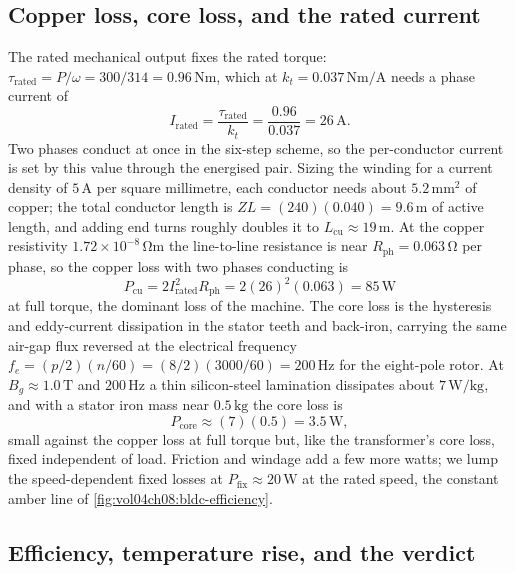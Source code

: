 \subsection{Copper loss, core loss, and the rated current}

The rated mechanical output fixes the rated torque: $\tau_{\text{rated}}
= P/\omega = 300/314 = 0.96\,\si{\newton\meter}$, which at $k_t = 0.037\,
\si{\newton\meter\per\ampere}$ needs a phase current of
\[
I_{\text{rated}} = \frac{\tau_{\text{rated}}}{k_t} = \frac{0.96}{0.037}
= 26\,\si{\ampere}.
\]
Two phases conduct at once in the six-step scheme, so the per-conductor
current is set by this value through the energised pair. Sizing the
winding for a current density of $5\,\si{\ampere}$ per square millimetre,
each conductor needs about $5.2\,\si{\milli\meter\squared}$ of copper; the
total conductor length is $Z L = (240)(0.040) = 9.6\,\si{\meter}$ of
active length, and adding end turns roughly doubles it to $L_{\text{cu}}
\approx 19\,\si{\meter}$. At the copper resistivity $1.72\times 10^{-8}\,
\si{\ohm\meter}$ the line-to-line resistance is near $R_{\text{ph}} =
0.063\,\si{\ohm}$ per phase, so the copper loss with two phases conducting
is
\[
P_{\text{cu}} = 2 I_{\text{rated}}^{2} R_{\text{ph}} = 2(26)^{2}(0.063)
= 85\,\si{\watt}
\]
at full torque, the dominant loss of the machine. The core loss is the
hysteresis and eddy-current dissipation in the stator teeth and back-iron,
carrying the same air-gap flux reversed at the electrical frequency
$f_e = (p/2)(n/60) = (8/2)(3000/60) = 200\,\si{\hertz}$ for the eight-pole
rotor. At $B_g \approx 1.0\,\si{\tesla}$ and $200\,\si{\hertz}$ a thin
silicon-steel lamination dissipates about $7\,\si{\watt\per\kilogram}$,
and with a stator iron mass near $0.5\,\si{\kilogram}$ the core loss is
\[
P_{\text{core}} \approx (7)(0.5) = 3.5\,\si{\watt},
\]
small against the copper loss at full torque but, like the transformer's
core loss, fixed independent of load. Friction and windage add a few more
watts; we lump the speed-dependent fixed losses at $P_{\text{fix}}
\approx 20\,\si{\watt}$ at the rated speed, the constant amber line of
\cref{fig:vol04ch08:bldc-efficiency}.



\subsection{Efficiency, temperature rise, and the verdict}

